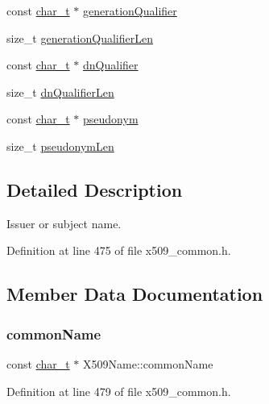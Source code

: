 \begin{DoxyCompactItemize}
\item 
const \hyperlink{compiler__port_8h_a40bb5262bf908c328fbcfbe5d29d0201}{char\+\_\+t} $\ast$ \hyperlink{structX509Name_af795a7195c222e32c6ece85764672094}{generation\+Qualifier}
\item 
size\+\_\+t \hyperlink{structX509Name_a295dd5dd5361f04b4f15cfb6d9488d76}{generation\+Qualifier\+Len}
\item 
const \hyperlink{compiler__port_8h_a40bb5262bf908c328fbcfbe5d29d0201}{char\+\_\+t} $\ast$ \hyperlink{structX509Name_aff2c9afbb89584912d7a66f70d2e21ea}{dn\+Qualifier}
\item 
size\+\_\+t \hyperlink{structX509Name_a070cb2ee94a282f233a4ee5a23a7374d}{dn\+Qualifier\+Len}
\item 
const \hyperlink{compiler__port_8h_a40bb5262bf908c328fbcfbe5d29d0201}{char\+\_\+t} $\ast$ \hyperlink{structX509Name_ac157a7985fd1b9ea07893de309947823}{pseudonym}
\item 
size\+\_\+t \hyperlink{structX509Name_a701db328dc75e341e16cc03f65abf062}{pseudonym\+Len}
\end{DoxyCompactItemize}


\subsection{Detailed Description}
Issuer or subject name. 

Definition at line 475 of file x509\+\_\+common.\+h.



\subsection{Member Data Documentation}
\mbox{\label{structX509Name_a29948ef6424aa86551582e5bf7afa47a}} 
\subsubsection{\texorpdfstring{common\+Name}{commonName}}
{\footnotesize\ttfamily const \hyperlink{compiler__port_8h_a40bb5262bf908c328fbcfbe5d29d0201}{char\+\_\+t} $\ast$ X509\+Name\+::common\+Name}



Definition at line 479 of file x509\+\_\+common.\+h.

\mbox{\label{structX509Name_a5c5af434bfa902d83cae8cec8af15581}} 
